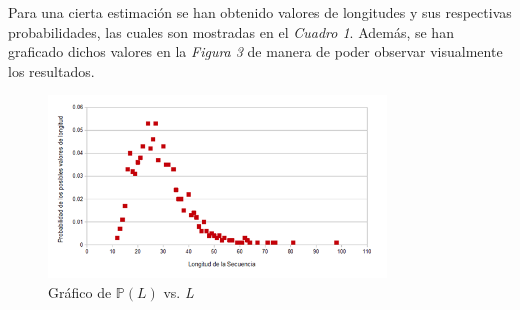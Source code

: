 \documentclass{article}
\begin{document}

\bigskip


\noindent Para una cierta estimación se han obtenido valores de longitudes y sus respectivas probabilidades, las cuales son mostradas en el \textit{Cuadro 1}. Además, se han graficado dichos valores en la \textit{Figura 3} de manera de poder observar visualmente los resultados.


\begin{figure}[h]
	\centering
	\includegraphics[width=0.80\textwidth]{images/longitud-vs-probabilidad.png}
	\caption{Gráfico de $\mathbb{P}(\textit{L})$ vs. \textit{L}}
\end{figure}
\bigskip
\end{document}
